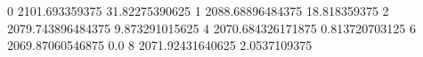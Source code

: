0 2101.693359375 31.82275390625
1 2088.68896484375 18.818359375
2 2079.743896484375 9.873291015625
4 2070.684326171875 0.813720703125
6 2069.87060546875 0.0
8 2071.92431640625 2.0537109375
